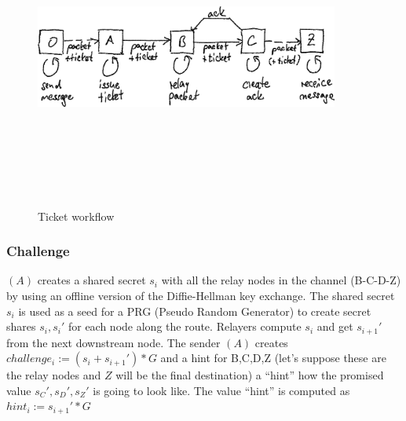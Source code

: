  \begin{figure}[H]
    \centering
    \includegraphics[width=10cm,height=10cm,keepaspectratio]{../whitepaper/images/ticket_workflow.png}
    \caption{Ticket workflow}
    \label{fig:Ticket worklow}
\end{figure}

\subsubsection{Challenge}
$(A)$ creates a shared secret $s_i$ with all the relay nodes in the channel (B-C-D-Z) by using an offline version of the Diffie-Hellman key exchange.
\newline The shared secret $s_i$ is used as a seed for a PRG (Pseudo Random Generator) to create secret shares $s_i,s_i'$ for each node along the route. 
Relayers compute $s_i$ and get $s_{i+1}'$ from the next downstream node. 
\newline The sender $(A)$ creates $challenge_i:=(s_i+s_{i+1}')*G$ and a hint for B,C,D,Z (let’s suppose these are the relay nodes and $Z$ will be the final destination) a “hint” how the promised value $s_C',s_D',s_Z'$ is going to look like. 
The value “hint” is computed as $hint_i:=s_{i+1}'*G$ 


